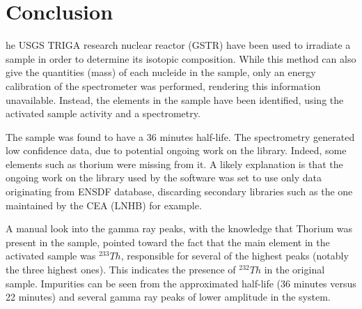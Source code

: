 %
%
\let\textcircled=\pgftextcircled
\chapter{Conclusion}
\label{chap:conclusion}

he USGS TRIGA research nuclear reactor (GSTR) have been used to irradiate a sample in order to determine its isotopic composition. While this method can also give the quantities (mass) of each nucleide in the sample, only an energy calibration of the spectrometer was performed, rendering this information unavailable. Instead, the elements in the sample have been identified, using the activated sample activity and a spectrometry.

The sample was found to have a 36 minutes half-life. The spectrometry generated low confidence data, due to potential ongoing work on the library. Indeed, some elements such as thorium were missing from it. A likely explanation is that the ongoing work on the library used by the software was set to use only data originating from ENSDF database, discarding secondary libraries such as the one maintained by the CEA (LNHB) for example.

A manual look into the gamma ray peaks, with the knowledge that Thorium was present in the sample, pointed toward the fact that the main element in the activated sample was $^{233}Th$, responsible for several of the highest peaks (notably the three highest ones). This indicates the presence of $^{232}Th$ in the original sample. Impurities can be seen from the approximated half-life (36 minutes versus 22 minutes) and several gamma ray peaks of lower amplitude in the system.


